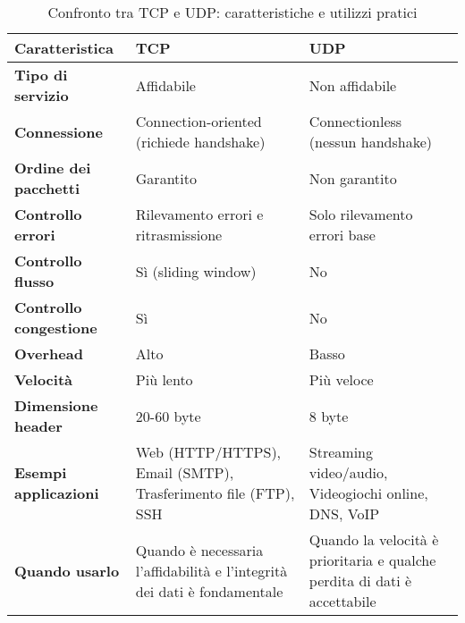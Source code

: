 \begin{table}[htbp]
    \centering
    \begin{tabular}{|p{4cm}|p{5.5cm}|p{5.5cm}|}
        \hline
        \rowcolor{gray!30}
        \textbf{Caratteristica} & \textbf{TCP} & \textbf{UDP} \\
        \hline
        \textbf{Tipo di servizio} & Affidabile & Non affidabile \\
        \hline
        \textbf{Connessione} & Connection-oriented (richiede handshake) & Connectionless (nessun handshake) \\
        \hline
        \textbf{Ordine dei pacchetti} & Garantito & Non garantito \\
        \hline
        \textbf{Controllo errori} & Rilevamento errori e ritrasmissione & Solo rilevamento errori base \\
        \hline
        \textbf{Controllo flusso} & Sì (sliding window) & No \\
        \hline
        \textbf{Controllo congestione} & Sì & No \\
        \hline
        \textbf{Overhead} & Alto & Basso \\
        \hline
        \textbf{Velocità} & Più lento & Più veloce \\
        \hline
        \textbf{Dimensione header} & 20-60 byte & 8 byte \\
        \hline
        \textbf{Esempi applicazioni} & Web (HTTP/HTTPS), Email (SMTP), Trasferimento file (FTP), SSH & Streaming video/audio, Videogiochi online, DNS, VoIP \\
        \hline
        \textbf{Quando usarlo} & Quando è necessaria l'affidabilità e l'integrità dei dati è fondamentale & Quando la velocità è prioritaria e qualche perdita di dati è accettabile \\
        \hline
    \end{tabular}
    \caption{Confronto tra TCP e UDP: caratteristiche e utilizzi pratici}
    \label{tab:tcp_vs_udp}
\end{table}

